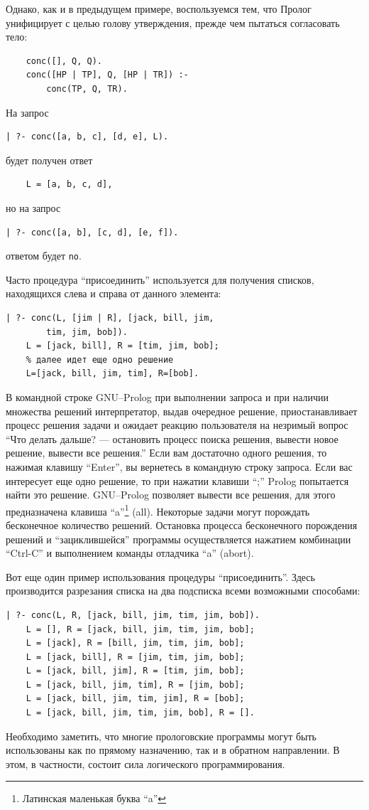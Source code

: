 \documentclass[12pt, openany, twoside]{book} %
\begin{document}
\noindent Однако, как и в предыдущем примере, воспользуемся тем, что Пролог унифицирует с целью голову утверждения, прежде чем пытаться согласовать тело:
{\tt\begin{verbatim}
    conc([], Q, Q).
    conc([HP | TP], Q, [HP | TR]) :-
        conc(TP, Q, TR).
\end{verbatim}}
\noindent На запрос
{\tt\begin{verbatim}
| ?- conc([а, b, с], [d, e], L).
\end{verbatim}}

\noindent будет получен ответ
{\tt\begin{verbatim}
    L = [a, b, c, d],
\end{verbatim}}
\noindent но на запрос
{\tt\begin{verbatim}
| ?- conc([a, b], [c, d], [e, f]).
\end{verbatim}}
\noindent ответом будет {\tt no}.

Часто процедура ``присоединить'' используется для получения списков, находящихся слева и справа от данного элемента:
{\tt\begin{verbatim}
| ?- conc(L, [jim | R], [jack, bill, jim,
        tim, jim, bob]).
    L = [jack, bill], R = [tim, jim, bob];
    % далее идет еще одно решение
    L=[jack, bill, jim, tim], R=[bob].
\end{verbatim}}
В командной строке GNU--Prolog при выполнении запроса и при наличии множества решений интерпретатор, выдав очередное решение, приостанавливает процесс решения задачи и ожидает реакцию пользователя на незримый вопрос ``Что делать дальше? --- остановить процесс поиска решения, вывести новое решение, вывести все решения.'' Если вам достаточно одного решения, то нажимая клавишу ``Enter'', вы вернетесь в командную строку запроса. Если вас интересует еще одно решение, то при нажатии клавиши ``;'' Prolog попытается найти это решение. GNU--Prolog позволяет вывести все решения, для этого предназначена клавиша ``a''\footnote{Латинская маленькая буква ``a''} (all). Некоторые задачи могут порождать бесконечное количество решений. Остановка процесса бесконечного порождения решений и ``зациклившейся'' программы осуществляется нажатием комбинации ``Ctrl-C'' и выполнением команды отладчика ``a'' (abort).

Вот еще один пример использования процедуры ``присоединить''. Здесь производится разрезания списка на два подсписка всеми возможными способами:
{\tt\begin{verbatim}
| ?- conc(L, R, [jack, bill, jim, tim, jim, bob]).
    L = [], R = [jack, bill, jim, tim, jim, bob];
    L = [jack], R = [bill, jim, tim, jim, bob];
    L = [jack, bill], R = [jim, tim, jim, bob];
    L = [jack, bill, jim], R = [tim, jim, bob];
    L = [jack, bill, jim, tim], R = [jim, bob];
    L = [jack, bill, jim, tim, jim], R = [bob];
    L = [jack, bill, jim, tim, jim, bob], R = [].
\end{verbatim}}
Необходимо заметить, что многие прологовские программы могут быть использованы как по прямому назначению, так и в обратном направлении. В этом, в частности, состоит сила логического программирования.
\end{document}
